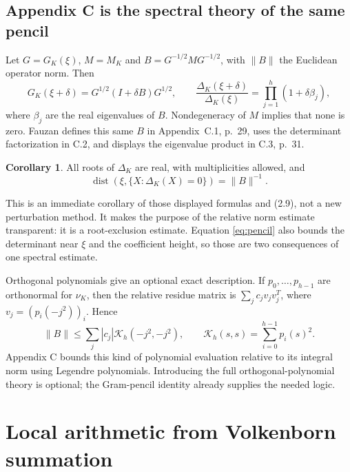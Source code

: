 \documentclass[11pt]{article}
\theoremstyle{definition}
\newtheorem{corollary}[proposition]{Corollary}
\theoremstyle{remark}\newtheorem*{remark}{Remark}
\begin{document}
\subsection{Appendix C is the spectral theory of the same pencil}
Let $G=G_K(\xi)$, $M=M_K$ and $B=G^{-1/2}MG^{-1/2}$, with $\|B\|$
the Euclidean operator norm. Then
\begin{equation}\label{eq:pencil}
 G_K(\xi+\delta)=G^{1/2}(I+\delta B)G^{1/2},\qquad
 \frac{\Delta_K(\xi+\delta)}{\Delta_K(\xi)}
     =\prod_{j=1}^h(1+\delta\beta_j),
\end{equation}
where $\beta_j$ are the real eigenvalues of $B$. Nondegeneracy of $M$ implies
that none is zero.
Fauzan defines this same $B$ in Appendix~C.1, p.~29, uses the determinant
factorization in C.2, and displays the eigenvalue product in C.3, p.~31.
\begin{corollary}\label{cor:roots}
All roots of $\Delta_K$ are real, with multiplicities allowed, and
\[
 \operatorname{dist}(\xi,\{X:\Delta_K(X)=0\})=\|B\|^{-1}.
\]
\end{corollary}
This is an immediate corollary of those displayed formulas and (2.9),
not a new perturbation method.
It makes the purpose of the relative norm estimate transparent: it is a
root-exclusion estimate. Equation \eqref{eq:pencil} also bounds the determinant
near $\xi$ and the coefficient height, so those are two consequences of one
spectral estimate.

Orthogonal polynomials give an optional exact description. If $p_0,\ldots,p_{h-1}$
are orthonormal for $\nu_K$, then the relative residue matrix is
$\sum_j c_j v_jv_j^T$, where $v_j=(p_i(-j^2))_i$. Hence
\[
 \|B\|\le\sum_j|c_j|\mathcal K_h(-j^2,-j^2),\qquad
 \mathcal K_h(s,s)=\sum_{i=0}^{h-1}p_i(s)^2.
\]
Appendix C bounds this kind of polynomial evaluation relative to its integral
norm using Legendre polynomials. Introducing the full orthogonal-polynomial
theory is optional; the Gram-pencil identity already supplies the needed logic.

\section{Local arithmetic from Volkenborn summation}
\end{document}
